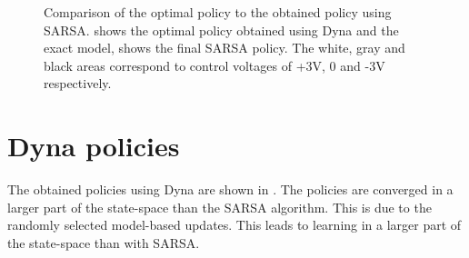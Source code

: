 \begin{figure}[htbp]
\centering
{}
\caption[Final policy using SARSA]{Comparison of the optimal policy to the obtained policy using SARSA.  shows the optimal policy obtained using Dyna and the exact model,  shows the final SARSA policy. The white, gray and black areas correspond to control voltages of +3V, 0 and -3V respectively.}
\label{fig:PS-SARSA_policies}
\end{figure}


\newpage
\section{Dyna policies}
The obtained policies using Dyna are shown in . The policies are converged in a larger part of the state-space than the SARSA algorithm. This is due to the randomly selected model-based updates. This leads to learning in a larger part of the state-space than with SARSA.

